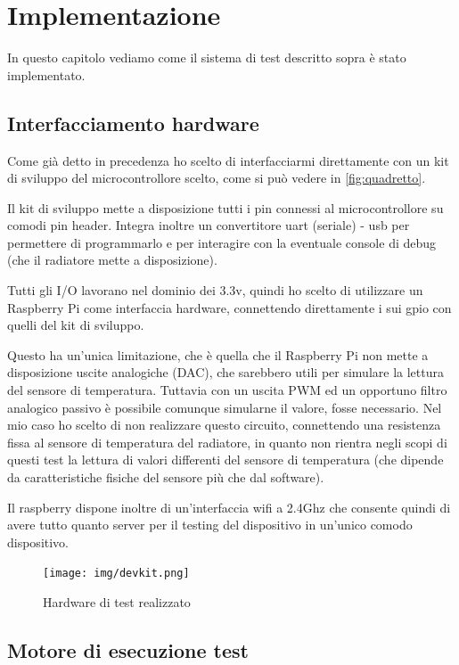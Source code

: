 \documentclass[12pt,a4paper,twoside,titlepage]{book}
\begin{document}
\chapter{Implementazione}

In questo capitolo vediamo come il sistema di test descritto sopra è stato implementato.

\section{Interfacciamento hardware}

Come già detto in precedenza ho scelto di interfacciarmi direttamente con un kit
di sviluppo del microcontrollore scelto, come si può vedere in \autoref{fig:quadretto}.

Il kit di sviluppo mette a disposizione tutti i pin connessi al microcontrollore
su comodi pin header. Integra inoltre un convertitore \Gls{uart} (seriale) - \acrshort{usb} per
permettere di programmarlo e per interagire con la eventuale console di debug
(che il radiatore mette a disposizione).

Tutti gli I/O lavorano nel dominio dei 3.3v, quindi ho scelto di utilizzare un
Raspberry Pi come interfaccia hardware, connettendo direttamente i sui \Gls{gpio} con
quelli del kit di sviluppo.

Questo ha un'unica limitazione, che è quella che il Raspberry Pi non mette a disposizione
uscite analogiche (DAC), che sarebbero utili per simulare la lettura del sensore di
temperatura. Tuttavia con un uscita PWM ed un opportuno filtro analogico passivo è
possibile comunque simularne il valore, fosse necessario. Nel mio caso ho scelto di
non realizzare questo circuito, connettendo una resistenza fissa al sensore di
temperatura del radiatore, in quanto non rientra negli scopi di questi test la lettura
di valori differenti del sensore di temperatura (che dipende da caratteristiche fisiche
del sensore più che dal software).

Il raspberry dispone inoltre di un'interfaccia \Gls{wifi} a 2.4Ghz che consente quindi di
avere tutto quanto server per il testing del dispositivo in un'unico comodo dispositivo.

\begin{figure}
    \centering
    \texttt{[image: img/devkit.png]}
    \caption{Hardware di test realizzato}
    \label{fig:quadretto}
\end{figure}

\section{Motore di esecuzione test}
\end{document}
